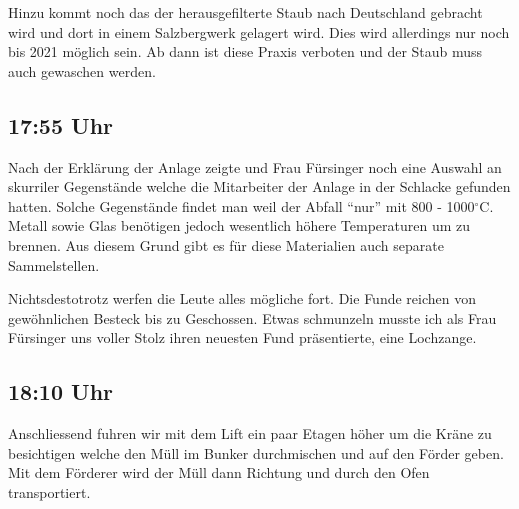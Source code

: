 \begin{center}
\end{center}

Hinzu kommt noch das der herausgefilterte Staub nach Deutschland
gebracht wird und dort in einem Salzbergwerk gelagert wird.
Dies wird allerdings nur noch bis 2021 möglich sein. Ab dann ist
diese Praxis verboten und der Staub muss auch gewaschen werden.

\subsection{17:55 Uhr}
\label{sec-2-5}
Nach der Erklärung der Anlage zeigte und Frau Fürsinger noch eine
Auswahl an skurriler Gegenstände welche die Mitarbeiter der Anlage in
der Schlacke gefunden hatten. Solche Gegenstände findet man weil der
Abfall ``nur'' mit 800 - 1000\(^{\circ}\)C. Metall sowie Glas benötigen
jedoch wesentlich höhere Temperaturen um zu brennen. Aus
diesem Grund gibt es für diese Materialien auch separate
Sammelstellen.  

\begin{center}
\end{center}

Nichtsdestotrotz werfen die Leute alles mögliche fort. Die Funde
reichen von gewöhnlichen Besteck bis zu Geschossen. Etwas schmunzeln
musste ich als Frau Fürsinger uns voller Stolz ihren neuesten Fund
präsentierte, eine Lochzange.

\subsection{18:10 Uhr}
\label{sec-2-6}
Anschliessend fuhren wir mit dem Lift ein paar Etagen höher um die
Kräne zu besichtigen welche den Müll im Bunker durchmischen und auf
den Förder geben.  Mit dem Förderer wird der Müll dann Richtung und
durch den Ofen transportiert. 

